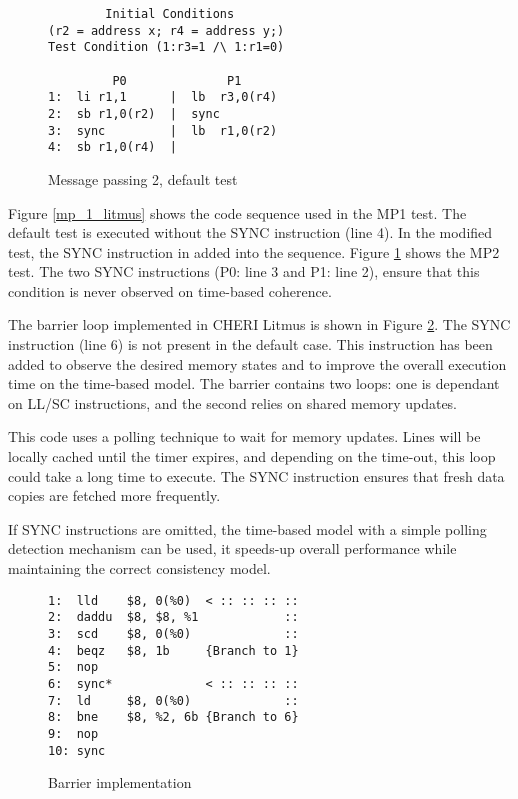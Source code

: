 \begin{figure}[!h]
\begin{tcolorbox}[
colback=blue!1!white,
colframe=blue!65!black]
\begin{center}
\begin{BVerbatim}
        Initial Conditions       
(r2 = address x; r4 = address y;)
Test Condition (1:r3=1 /\ 1:r1=0)

         P0              P1 
1:  li r1,1      |  lb  r3,0(r4) 
2:  sb r1,0(r2)  |  sync 
3:  sync         |  lb  r1,0(r2) 
4:  sb r1,0(r4)  | 
\end{BVerbatim}
\end{center}
\end{tcolorbox}
\caption{Message passing 2, default test}
\label{mp_2_litmus}
\end{figure}

		Figure \ref{mp_1_litmus} shows the code sequence used in the MP1 test. The default test is executed without the SYNC instruction (line 4). In the modified test, the SYNC instruction in added into the sequence. Figure \ref{mp_2_litmus} shows the MP2 test. The two SYNC instructions (P0: line 3 and P1: line 2), ensure that this condition is never observed on time-based coherence.

		The barrier loop implemented in CHERI Litmus is shown in Figure \ref{barrier_litmus}. The SYNC instruction (line 6) is not present in the default case. 
		This instruction has been added to observe the desired memory states and to improve the overall execution time on the time-based model. 
		The barrier contains two loops: one is dependant on LL/SC instructions, and the second relies on shared memory updates. 
		
		This code uses a polling technique to wait for memory updates. Lines will be locally cached until the timer expires, and depending on the time-out, this loop could take a long time to execute. The SYNC instruction ensures that fresh data copies are fetched more frequently.
		
		If SYNC instructions are omitted, the time-based model with a simple polling detection mechanism can be used, it speeds-up overall performance while maintaining the correct consistency model.
		
\begin{figure}[!h]
\begin{tcolorbox}[
colback=violet!1!white,
colframe=violet!75!black]
\begin{center}
\begin{BVerbatim}
1:  lld    $8, 0(%
2:  daddu  $8, $8, %
3:  scd    $8, 0(%
4:  beqz   $8, 1b     {Branch to 1}
5:  nop
6:  sync*             < :: :: :: ::
7:  ld     $8, 0(%
8:  bne    $8, %
9:  nop
10: sync
\end{BVerbatim} 
\end{center}
\end{tcolorbox}
\caption{Barrier implementation}
\label{barrier_litmus}
\end{figure}
		
